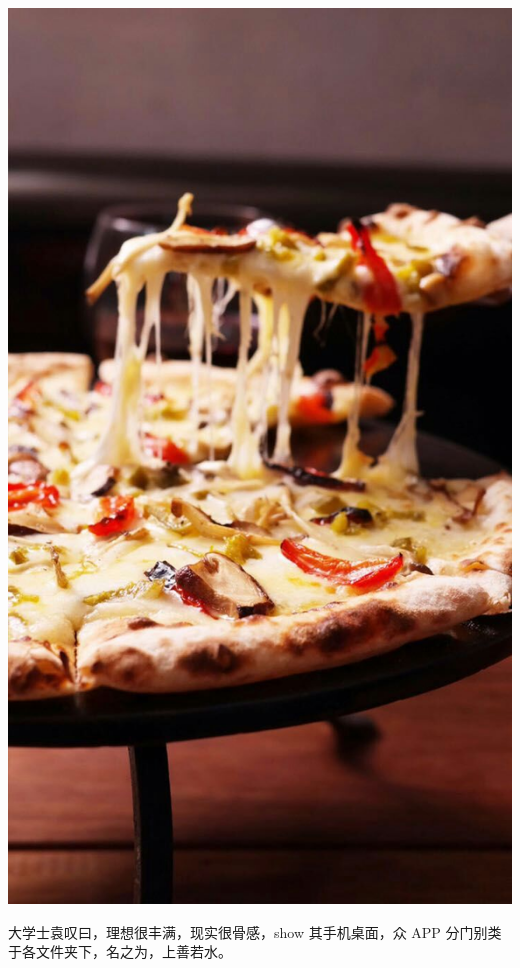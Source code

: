 \documentclass[12pt, a4paper]{book}
\begin{document}
\begin{CJK}{UTF8}{gbsn}
    \includegraphics[height=0.3\textheight]{./figure/desktop-1.jpg}

    大学士袁叹曰，理想很丰满，现实很骨感，show 其手机桌面，众 APP 分门别类于各文件夹下，名之为，上善若水。


\end{CJK}
\end{document}
